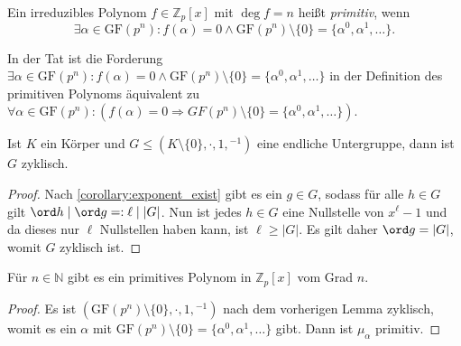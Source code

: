 
\begin{definition}
    Ein irreduzibles Polynom $f \in \mathbb{Z}_p[x]$ mit $\deg f = n$ heißt \emph{primitiv}, wenn 
    $$\exists \alpha \in \mathrm{GF}(p^n): f(\alpha)=0 \land \mathrm{GF}(p^n)\setminus\{0\} = \{\alpha^0, \alpha^1, \ldots \}. $$
\end{definition}

\begin{remark}
    In der Tat ist die Forderung $\exists \alpha\in \mathrm{GF}(p^n):f(\alpha)=0\land \mathrm{GF}(p^n)\setminus\{0\}=\{\alpha^0,\alpha^1,\ldots\}$ in der Definition des primitiven Polynoms äquivalent zu $\forall\alpha\in\mathrm{GF}(p^n):(f(\alpha)=0\Rightarrow GF(p^n)\setminus\{0\}=\{\alpha^0,\alpha^1,\ldots\})$. 
\end{remark}

\begin{lemma}
    Ist $K$ ein Körper und $G \le (K \setminus \{0\}, \cdot, 1, {}^{-1})$ eine endliche Untergruppe, dann ist $G$ zyklisch.
\end{lemma}
\begin{proof}
    Nach \cref{corollary:exponent_exist} gibt es ein $g \in G$, sodass für alle $h \in G$ gilt $\ord h \mid \ord g =: \ell \mid \vert G \vert$. Nun ist jedes $h \in G$ eine Nullstelle von $x^\ell-1$ und da dieses nur $\ell$ Nullstellen haben kann, ist $\ell \geq \vert G\vert$. Es gilt daher $\ord g = \vert G \vert$, womit $G$ zyklisch ist.
\end{proof}

\begin{corollary}
    Für $n \in \mathbb{N}$ gibt es ein primitives Polynom in $\mathbb{Z}_p[x]$ vom Grad $n$.
\end{corollary}
\begin{proof}
    Es ist $(\mathrm{GF}(p^n)\setminus\{0\}, \cdot, 1, {}^{-1})$ nach dem vorherigen Lemma zyklisch, womit es ein $\alpha$ mit $\mathrm{GF}(p^n)\setminus\{0\} = \{\alpha^0, \alpha^1, \ldots\}$ gibt. Dann ist $\mu_\alpha$ primitiv.
\end{proof}

